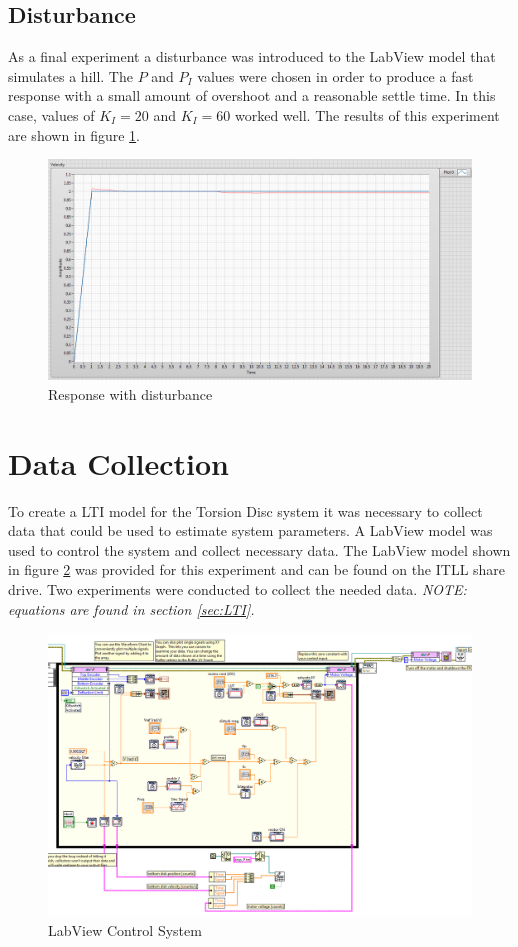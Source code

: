 \documentclass[11pt,titlepage]{article}
\begin{document}
	\subsection{Disturbance} 
		As a final experiment a disturbance was introduced to the LabView model that simulates a hill. The $P$ and $P_I$ values were chosen in order to produce a fast response with a small amount of overshoot and a reasonable settle time. In this case, values of $K_I=20$ and $K_I=60$ worked well. The results of this experiment are shown in figure \ref{fig:resp_dist}.
		\begin{figure}[h!]
			\centering
			\includegraphics[scale=.4]{disturbance}
			\caption{Response with disturbance}
			\label{fig:resp_dist}
		\end{figure}

\section{Data Collection}
	To create a LTI model for the Torsion Disc system it was necessary to collect data that could be used to estimate system parameters. A LabView model was used to control the system and collect necessary data. The LabView model shown in figure \ref{fig:labview_sys} was provided for this experiment and can be found on the ITLL share drive. Two experiments were conducted to collect the needed data. \emph{NOTE: equations are found in section \ref{sec:LTI}.}
	\begin{figure}[h!]
			\centering
			\includegraphics[trim={0 0 10cm 0},clip,scale=0.4]{labviewModel}
			\caption{LabView Control System}
			\label{fig:labview_sys}
	\end{figure}
\end{document}
